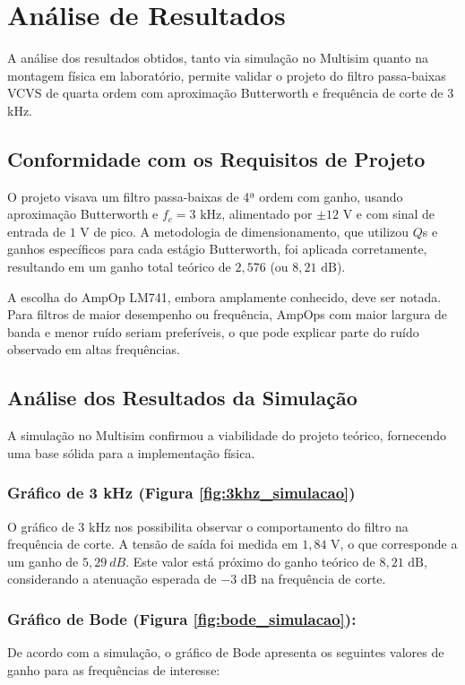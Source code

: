 \section{Análise de Resultados}

A análise dos resultados obtidos, tanto via simulação no Multisim\textregistered{} quanto na montagem física em laboratório, permite validar o projeto do filtro passa-baixas VCVS de quarta ordem com aproximação Butterworth e frequência de corte de 3 kHz.

\subsection{Conformidade com os Requisitos de Projeto}
O projeto visava um filtro passa-baixas de 4ª ordem com ganho, usando aproximação Butterworth e $f_c = 3 \text{ kHz}$, alimentado por $\pm 12 \text{ V}$ e com sinal de entrada de $1 \text{ V}$ de pico. A metodologia de dimensionamento, que utilizou $Q$s e ganhos específicos para cada estágio Butterworth, foi aplicada corretamente, resultando em um ganho total teórico de $2,576$ (ou $8,21 \text{ dB}$).

A escolha do AmpOp LM741, embora amplamente conhecido, deve ser notada. Para filtros de maior desempenho ou frequência, AmpOps com maior largura de banda e menor ruído seriam preferíveis, o que pode explicar parte do ruído observado em altas frequências.

\subsection{Análise dos Resultados da Simulação}
A simulação no Multisim\textregistered{} confirmou a viabilidade do projeto teórico, fornecendo uma base sólida para a implementação física.

\subsubsection{Gráfico de 3 kHz (Figura \ref{fig:3khz_simulacao})} 
O gráfico de 3 kHz nos possibilita observar o comportamento do filtro na frequência de corte. A tensão de saída foi medida em $1,84 \text{ V}$, o que corresponde a um ganho de $5,29~dB$. Este valor está próximo do ganho teórico de $8,21 \text{ dB}$, considerando a atenuação esperada de $-3 \text{ dB}$ na frequência de corte.

\subsubsection{Gráfico de Bode (Figura \ref{fig:bode_simulacao}):} 
De acordo com a simulação, o gráfico de Bode apresenta os seguintes valores de ganho para as frequências de interesse:


